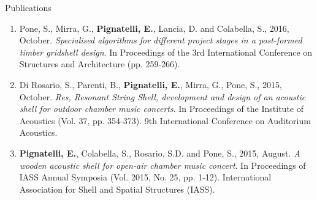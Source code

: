 \documentclass{resume}
\begin{document}
\begin{rSection}{Publications}
\begin{enumerate}[leftmargin=0.45cm, itemsep=0em, topsep=0.5em, parsep=0.2em]
        \item Pone, S., Mirra, G., \textbf{Pignatelli, E.}, Lancia, D. and Colabella, S., 2016, October. \textit{Specialised algorithms for different project stages in a post-formed timber gridshell design}. In Proceedings of the 3rd International Conference on Structures and Architecture (pp. 259-266).
        \item Di Rosario, S., Parenti, B., \textbf{Pignatelli, E.}, Mirra, G., Pone, S., 2015, October. \textit{Res, Resonant String Shell, development and design of an acoustic shell for outdoor chamber music concerts}. In Proceedings of the Institute of Acoustics (Vol. 37, pp. 354-373). 9th International Conference on Auditorium Acoustics.
        \item \textbf{Pignatelli, E.}, Colabella, S., Rosario, S.D. and Pone, S., 2015, August. \textit{A wooden acoustic shell for open-air chamber music concert}. In Proceedings of IASS Annual Symposia (Vol. 2015, No. 25, pp. 1-12). International Association for Shell and Spatial Structures (IASS).
    \end{enumerate}
    \end{rSection}
    
\end{document}
